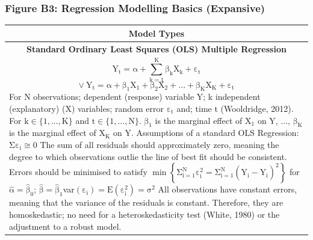 \documentclass[11pt, english]{article}
\begin{document}
	\newpage

		\subsubsection*{Figure B3: Regression Modelling Basics (Expansive)}

		\begin{center}
			\scriptsize
		\begin{longtable}{p{14cm}}
			\hline
			\hline
			\multicolumn{1}{c}{\textbf{Model Types}}\\
			\hline
			\hline
			\multicolumn{1}{c}{\textbf{Standard Ordinary Least Squares (OLS) Multiple Regression}}\\
			\hline
			$$\mathrm{Y_t=\alpha+\sum_{k=1}^K\beta_kX_k+\varepsilon_t}$$
			$$\mathrm{\lor\ Y_t=\alpha+\beta_1X_1+\beta_2X_2+...+\beta_KX_K+\varepsilon_t}$$
			For N observations; dependent (response) variable Y; k independent (explanatory) (X) variables; random error $\mathrm{\varepsilon_t}$ and; time t (Wooldridge, 2012). For $\mathrm{k\in\{1,...,K\}}$ and $\mathrm{t\in\{1,...,N\}}$.\newline\newline 
			$\mathrm{\beta_1}$ is the marginal effect of X$_1$ on Y, ..., $\mathrm{\beta_K}$ is the marginal effect of X$\mathrm{_K}$ on Y.\newline\newline
			Assumptions of a standard OLS Regression:\newline\newline
			[1] $\mathrm{\Sigma\varepsilon_i\cong0}$\newline\newline
			The sum of all residuals should approximately zero, meaning the degree to which observations outlie the line of best fit should be consistent. Errors should be minimised to satisfy $\mathrm{\min\left\{\Sigma_{i=1}^N\varepsilon_i^2=\Sigma_{i=1}^N\left(Y_i-\hat{Y}_i\right)^2\right\}}$ for $\mathrm{\hat{\alpha}=\hat{\beta}_0}$; $\mathrm{\hat{\beta}=\hat{\beta}_1}$\newline\newline
			[2] var$\mathrm{(\varepsilon_i)=E(\varepsilon_i^2)=\sigma^2}$\newline\newline
			All observations have constant errors, meaning that the variance of the residuals is constant. Therefore, they are homoskedastic; no need for a heteroskedasticity test (White, 1980) or the adjustment to a robust model.\newline\newline

\end{longtable}
\end{center}
\end{document}
